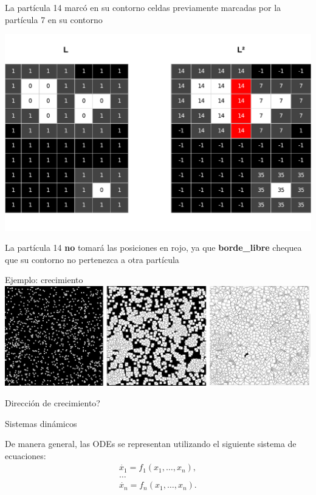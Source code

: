 \documentclass[spanish]{beamer}
\begin{document}
\begin{frame}
La partícula 14 marcó en su contorno celdas previamente marcadas por la partícula 7 en su contorno
\centerline{\includegraphics[scale = 0.45]{../figures/sistemaparticulas}}
La partícula 14 \textbf{no} tomará las posiciones en rojo, ya que \textbf{borde\_libre} chequea que su contorno no pertenezca a otra partícula
\end{frame}

\begin{frame}{Ejemplo: crecimiento}
\includegraphics[scale = 0.15]{../figures/modeladocrec}

\centering
Dirección de crecimiento?
\end{frame}


\begin{frame}{Sistemas dinámicos}

De manera general, las ODEs se representan utilizando el siguiente sistema de ecuaciones:
\begin{equation*}
  \begin{aligned}
    \dot{x_{1}} = f_{1}(x_{1},\ldots,x_{n}),\\
    \ldots\\
    \dot{x_{n}} = f_{n}(x_{1},\ldots,x_{n}).
  \end{aligned}
\end{equation*}



\end{frame}
\end{document}
